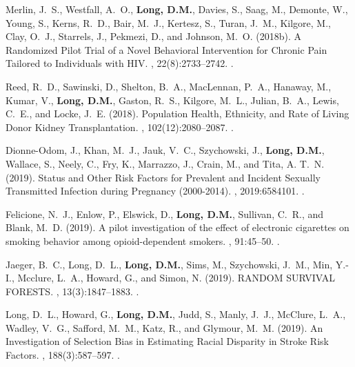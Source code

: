\begin{thebibliography}{}
Merlin, J.~S., Westfall, A.~O., \textbf{Long, D.M.}, Davies, S., Saag, M., Demonte, W.,
  Young, S., Kerns, R.~D., Bair, M.~J., Kertesz, S., Turan, J.~M., Kilgore, M.,
  Clay, O.~J., Starrels, J., Pekmezi, D., and Johnson, M.~O. (2018b).
\newblock A {Randomized} {Pilot} {Trial} of a {Novel} {Behavioral}
  {Intervention} for {Chronic} {Pain} {Tailored} to {Individuals} with {HIV}.
, 22(8):2733--2742.
.  


Reed, R.~D., Sawinski, D., Shelton, B.~A., MacLennan, P.~A., Hanaway, M.,
  Kumar, V., \textbf{Long, D.M.}, Gaston, R.~S., Kilgore, M.~L., Julian, B.~A., Lewis,
  C.~E., and Locke, J.~E. (2018).
\newblock Population {Health}, {Ethnicity}, and {Rate} of {Living} {Donor}
  {Kidney} {Transplantation}.
, 102(12):2080--2087.
.  


Dionne-Odom, J., Khan, M.~J., Jauk, V.~C., Szychowski, J., \textbf{Long, D.M.},
  Wallace, S., Neely, C., Fry, K., Marrazzo, J., Crain, M., and Tita, A. T.~N.
  (2019).
 {Status} and {Other} {Risk} {Factors} for {Prevalent} and
  {Incident} {Sexually} {Transmitted} {Infection} during {Pregnancy}
  (2000-2014).
, 2019:6584101.
.  


Felicione, N.~J., Enlow, P., Elswick, D., \textbf{Long, D.M.}, Sullivan, C.~R., and Blank,
  M.~D. (2019).
\newblock A pilot investigation of the effect of electronic cigarettes on
  smoking behavior among opioid-dependent smokers.
, 91:45--50.
.   


Jaeger, B.~C., Long, D.~L., \textbf{Long, D.M.}, Sims, M., Szychowski, J.~M., Min,
  Y.-I., Mcclure, L.~A., Howard, G., and Simon, N. (2019).
 {RANDOM} {SURVIVAL} {FORESTS}.
, 13(3):1847--1883.
.  


Long, D.~L., Howard, G., \textbf{Long, D.M.}, Judd, S., Manly, J.~J., McClure, L.~A.,
  Wadley, V.~G., Safford, M.~M., Katz, R., and Glymour, M.~M. (2019).
\newblock An {Investigation} of {Selection} {Bias} in {Estimating} {Racial}
  {Disparity} in {Stroke} {Risk} {Factors}.
, 188(3):587--597.
.  



\end{thebibliography}
